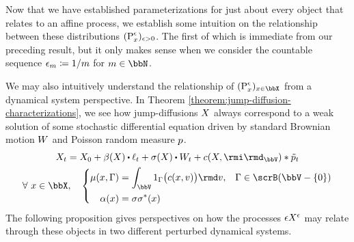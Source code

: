 

Now that we have established parameterizations for just about every object that relates to an affine process, we establish some intuition on the relationship between these distributions $({\operatorname{P}}^\epsilon_x)_{\epsilon>0}$.
The first of which is immediate from our preceding result, but it only makes sense when we consider the countable sequence $\epsilon_m \coloneqq 1/m$ for $m \in \bbN$.



We may also intuitively understand the relationship of $(\Prb^\epsilon_\stateVar)_{\stateVar\in\stateSpace}$ from a dynamical system perspective.
In Theorem \ref{theorem:jump-diffusion-characterizations}, we see how jump-diffusions $X$ always correspond to a weak solution of some stochastic differential equation driven by standard Brownian motion $W$ and Poisson random measure $p$.
\begin{equation}
  \label{eq:sde-reminder}
  \begin{gathered}
    \X_t = \X_0 + \affDrift(\X) \shortInt \leb_t + \affDiffSqrt(\X) \shortInt \W_t + \thinner(\X, \id_\vecSpace) \ast \compensate{\poisRM}_t \\
    \forall ~ \stateVar \in \stateSpace, \quad \left\{\begin{aligned}
      \affJump(\stateVar, \Gamma) &= \int_\vecSpace 1_\Gamma\big(\thinner(\stateVar, \markVar)\big) \rmd\markVar, & \Gamma \in \scrB(\vecSpace-\{0\}) \\
      \affDiff(\stateVar) &= \affDiffSqrt\affDiffSqrt^*(\stateVar)
    \end{aligned}\right.
  \end{gathered}
\end{equation}
The following proposition gives perspectives on how the processes $\epsilon X^\epsilon$ may relate through these objects in two different perturbed dynamical systems.


